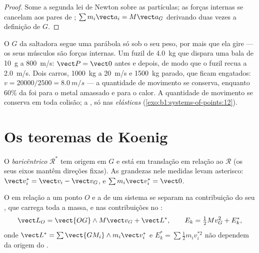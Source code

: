 \begin{proof}
Some a segunda lei de Newton sobre as partículas; as forças internas se
cancelam aos pares de ; $\sum m_i\vect a_i = M\vect a_G$
derivando duas vezes a definição de $G$.
\end{proof}

\begin{example}\label{ex:b1:systems-of-points:cm}
O $G$ da saltadora segue uma parábola só sob o seu peso, por mais que ela
gire --- os seus músculos são forças internas. Um fuzil de \qty{4.0}{kg}
que dispara uma bala de \qty{10}{g} a \qty{800}{m/s}: $\vect P = \vect 0$ antes
e depois, de modo que o fuzil recua a \qty{2.0}{m/s}. Dois carros, \qty{1000}{kg}
a \qty{20}{m/s} e \qty{1500}{kg} parado, que ficam engatados: $v =
20000/2500 = \qty{8.0}{m/s}$ --- a quantidade de movimento se conserva, enquanto $60\%$ da
 foi para o metal amassado e para o calor. A quantidade de
movimento se conserva em toda colisão; a , só nas
\emph{elásticas} (\cref{exo:b1:systems-of-points:12}).
\end{example}

\section{Os teoremas de Koenig}

\begin{definition}\label{def:b1:systems-of-points:barycentric}
O \emph{ baricêntrico} $\mathcal R^*$ tem origem em $G$ e está
em translação em relação ao  $\mathcal R$ (os seus eixos
mantêm direções fixas). As grandezas nele medidas levam asterisco: $\vect v_i^*
= \vect v_i - \vect v_G$, e $\sum m_i\vect v_i^* = \vect 0$.
\end{definition}

\begin{theorem}\label{thm:b1:systems-of-points:koenig}
O  em relação a um ponto $O$ e a  de um
sistema se separam na contribuição do seu , que carrega
toda a massa, e nas contribuições no :
\[
\vect L_O = \vect{OG}\wedge M\vect v_G + \vect L^*, \qquad
E_k = \tfrac12 Mv_G^2 + E_k^*,
\]
onde $\vect L^* = \sum\vect{GM_i}\wedge m_i\vect v_i^*$ e $E_k^* = \sum\tfrac12
m_iv_i^{*2}$ não dependem da origem do .
\end{theorem}

